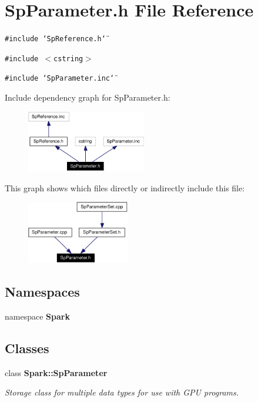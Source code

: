 \section{Sp\-Parameter.h File Reference}
\label{SpParameter_8h}
{\tt \#include \char`\"{}Sp\-Reference.h\char`\"{}}\par
{\tt \#include $<$cstring$>$}\par
{\tt \#include \char`\"{}Sp\-Parameter.inc\char`\"{}}\par


Include dependency graph for Sp\-Parameter.h:\begin{figure}[H]
\begin{center}
\leavevmode
\includegraphics[width=148pt]{SpParameter_8h__incl}
\end{center}
\end{figure}


This graph shows which files directly or indirectly include this file:\begin{figure}[H]
\begin{center}
\leavevmode
\includegraphics[width=127pt]{SpParameter_8h__dep__incl}
\end{center}
\end{figure}
\subsection*{Namespaces}
\begin{CompactItemize}
\item 
namespace {\bf Spark}
\end{CompactItemize}
\subsection*{Classes}
\begin{CompactItemize}
\item 
class {\bf Spark::Sp\-Parameter}
\begin{CompactList}\small\item\em Storage class for multiple data types for use with GPU programs. \item\end{CompactList}\end{CompactItemize}
